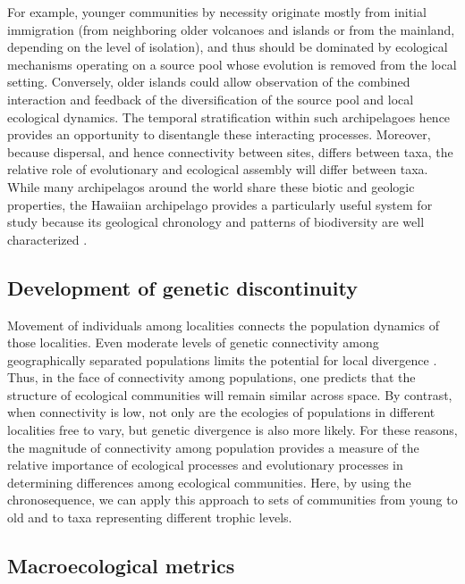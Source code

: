 \documentclass[12pt]{article}
\begin{document}
\begin{linenumbers}
For example, younger communities by necessity originate mostly from
initial immigration (from neighboring older volcanoes and islands or
from the mainland, depending on the level of isolation), and thus
should be dominated by ecological mechanisms operating on a source
pool whose evolution is removed from the local setting. Conversely,
older islands could allow observation of the combined interaction and
feedback of the diversification of the source pool and local
ecological dynamics.  The temporal stratification within such
archipelagoes hence provides an opportunity to disentangle these
interacting processes. Moreover, because dispersal, and hence
connectivity between sites, differs between taxa, the relative role of
evolutionary and ecological assembly will differ between taxa. While
many archipelagos around the world share these biotic and geologic
properties, the Hawaiian archipelago provides a particularly useful
system for study because its geological chronology \citep{price2002}
and patterns of biodiversity are well characterized
\citep{wagnerFunk}.


\subsection*{Development of genetic discontinuity}

Movement of individuals among localities connects the population
dynamics of those localities.  Even moderate levels of genetic
connectivity among geographically separated populations limits the
potential for local divergence \citep{wright1978, slatkin1987}.  Thus,
in the face of connectivity among populations, one predicts that the
structure of ecological communities will remain similar across space.
By contrast, when connectivity is low, not only are the ecologies of
populations in different localities free to vary, but genetic
divergence is also more likely.  For these reasons, the magnitude of
connectivity among population provides a measure of the relative
importance of ecological processes and evolutionary processes in
determining differences among ecological communities.  Here, by using
the chronosequence, we can apply this approach to sets of communities
from young to old and to taxa representing different trophic levels.


\subsection*{Macroecological metrics}


\end{linenumbers}
\end{document}
